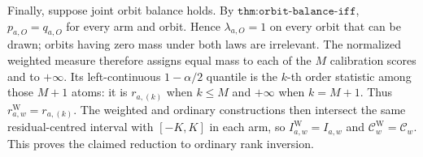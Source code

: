 Finally, suppose joint orbit balance holds. By \(\texttt{thm:orbit-balance-iff}\), \(p_{a,O}=q_{a,O}\) for every arm and orbit. Hence \(\lambda_{a,O}=1\) on every orbit that can be drawn; orbits having zero mass under both laws are irrelevant. The normalized weighted measure therefore assigns equal mass to each of the \(M\) calibration scores and to \(+\infty\). Its left-continuous \(1-\alpha/2\) quantile is the \(k\)-th order statistic among those \(M+1\) atoms: it is \(r_{a,(k)}\) when \(k\le M\) and \(+\infty\) when \(k=M+1\). Thus \(r^{\mathrm W}_{a,w}=r_{a,(k)}\). The weighted and ordinary constructions then intersect the same residual-centred interval with \([-K,K]\) in each arm, so \(I^{\mathrm W}_{a,w}=I_{a,w}\) and \(\mathcal C^{\mathrm W}_w=\mathcal C_w\). This proves the claimed reduction to ordinary rank inversion.